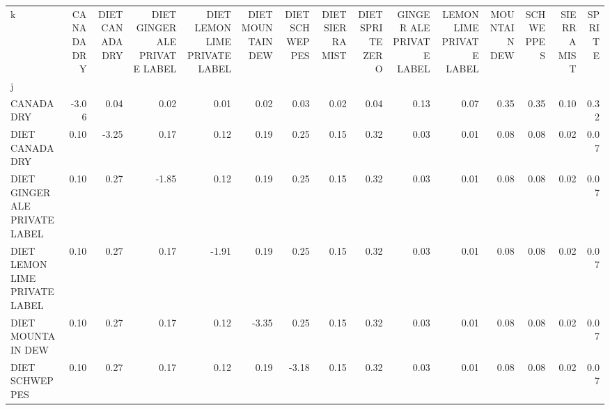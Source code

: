 \begin{tabular}{lrrrrrrrrrrrrrr}
\toprule
k &  CANADA DRY &  DIET CANADA DRY &  DIET GINGER ALE PRIVATE LABEL &  DIET LEMON LIME PRIVATE LABEL &  DIET MOUNTAIN DEW &  DIET SCHWEPPES &  DIET SIERRA MIST &  DIET SPRITE ZERO &  GINGER ALE PRIVATE LABEL &  LEMON LIME PRIVATE LABEL &  MOUNTAIN DEW &  SCHWEPPES &  SIERRA MIST &  SPRITE \\
j                             &             &                  &                                &                                &                    &                 &                   &                   &                           &                           &               &            &              &         \\
\midrule
CANADA DRY                    &       -3.06 &             0.04 &                           0.02 &                           0.01 &               0.02 &            0.03 &              0.02 &              0.04 &                      0.13 &                      0.07 &          0.35 &       0.35 &         0.10 &    0.32 \\
DIET CANADA DRY               &        0.10 &            -3.25 &                           0.17 &                           0.12 &               0.19 &            0.25 &              0.15 &              0.32 &                      0.03 &                      0.01 &          0.08 &       0.08 &         0.02 &    0.07 \\
DIET GINGER ALE PRIVATE LABEL &        0.10 &             0.27 &                          -1.85 &                           0.12 &               0.19 &            0.25 &              0.15 &              0.32 &                      0.03 &                      0.01 &          0.08 &       0.08 &         0.02 &    0.07 \\
DIET LEMON LIME PRIVATE LABEL &        0.10 &             0.27 &                           0.17 &                          -1.91 &               0.19 &            0.25 &              0.15 &              0.32 &                      0.03 &                      0.01 &          0.08 &       0.08 &         0.02 &    0.07 \\
DIET MOUNTAIN DEW             &        0.10 &             0.27 &                           0.17 &                           0.12 &              -3.35 &            0.25 &              0.15 &              0.32 &                      0.03 &                      0.01 &          0.08 &       0.08 &         0.02 &    0.07 \\
DIET SCHWEPPES                &        0.10 &             0.27 &                           0.17 &                           0.12 &               0.19 &           -3.18 &              0.15 &              0.32 &                      0.03 &                      0.01 &          0.08 &       0.08 &         0.02 &    0.07 \\

\end{tabular}
